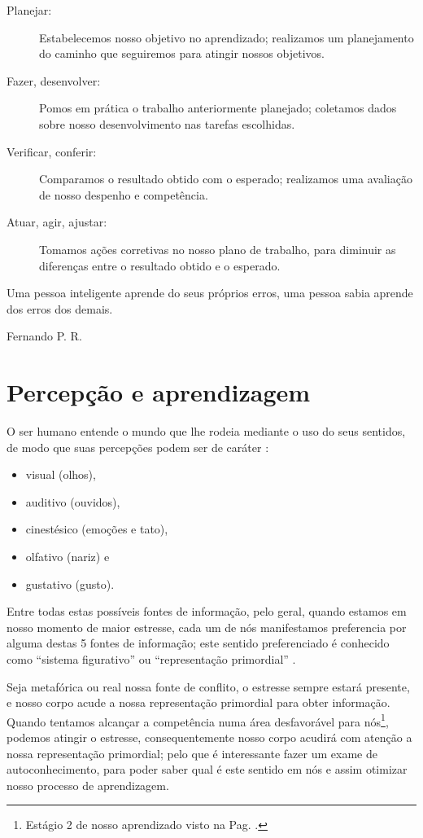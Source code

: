 \begin{description}
\item[Planejar:] Estabelecemos nosso objetivo no aprendizado; 
realizamos um planejamento do caminho que seguiremos para atingir nossos objetivos.
\item[Fazer, desenvolver:] Pomos em prática o trabalho anteriormente planejado;
coletamos dados sobre nosso desenvolvimento nas tarefas escolhidas.
\item[Verificar, conferir:] Comparamos o resultado obtido com o esperado;
realizamos uma avaliação de nosso despenho e competência.
\item[Atuar, agir, ajustar:] Tomamos ações corretivas no nosso plano de trabalho,
para diminuir as diferenças entre o resultado obtido e o esperado.
\end{description}


\begin{tcbattention}
Uma pessoa inteligente aprende do seus próprios erros,
uma pessoa sabia aprende dos erros dos demais.
\begin{flushright}
Fernando P. R.
\end{flushright}
\end{tcbattention}


\section{Percepção e aprendizagem}
\label{sec:percepcionaprendizagem}

O ser humano entende o mundo que lhe rodeia mediante o uso do seus sentidos,
de modo que suas percepções podem ser de caráter \cite[pp. 28]{ready2010pnl}:
\begin{itemize}
\item visual (olhos), 
\item auditivo (ouvidos),
\item cinestésico (emoções e tato), 
\item olfativo (nariz) e
\item gustativo (gusto).
\end{itemize}
Entre todas estas possíveis fontes de informação,
pelo geral, quando estamos em nosso momento de maior estresse,
cada um de nós manifestamos preferencia por alguma destas 5 fontes de informação;
este sentido preferenciado é conhecido como ``sistema figurativo'' ou ``representação primordial''
\cite[pp. 28]{ready2010pnl}.

Seja metafórica ou real nossa fonte de conflito, o estresse sempre estará presente,
e nosso corpo acude a nossa representação primordial para obter informação.
Quando tentamos alcançar a competência numa área desfavorável para nós\footnote{Estágio 
2 de nosso aprendizado visto na Pag. \pageref{ref:IncompetenciaConsciente}.},
podemos atingir o estresse, consequentemente nosso corpo acudirá com atenção a 
nossa representação primordial;
pelo que é interessante fazer um exame de autoconhecimento, 
para poder saber qual é este sentido em nós e assim otimizar nosso processo de aprendizagem.


